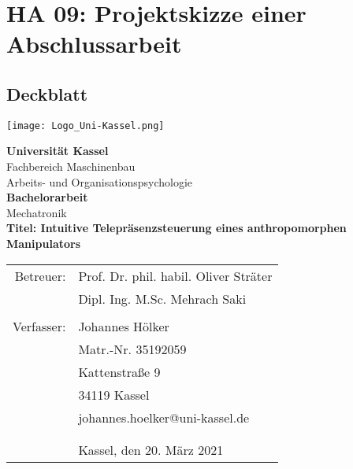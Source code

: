 \section{HA 09: Projektskizze einer Abschlussarbeit}
\subsection{Deckblatt}
\texttt{[image: Logo\_Uni-Kassel.png]}\vspace{50pt}
\begin{center}
\textbf{Universität Kassel}\\
Fachbereich Maschinenbau\\
Arbeits- und Organisationspsychologie\\\vspace{50pt}
\textbf{Bachelorarbeit}\\
Mechatronik\\\vspace{20pt}
\textbf{Titel: Intuitive Telepräsenzsteuerung eines anthropomorphen Manipulators}\\\vspace{50pt}
\begin{tabular}{rl}
Betreuer: & Prof. Dr. phil. habil. Oliver Sträter\\
 & Dipl. Ing. M.Sc. Mehrach Saki \\
  & \\
Verfasser: & Johannes Hölker\\
 & Matr.-Nr. 35192059\\
 & Kattenstraße 9\\
 & 34119 Kassel\\
 & johannes.hoelker@uni-kassel.de\\\vspace{40pt}
 & \\
 & \\
 & Kassel, den 20. März 2021\\
\end{tabular}
\end{center}
